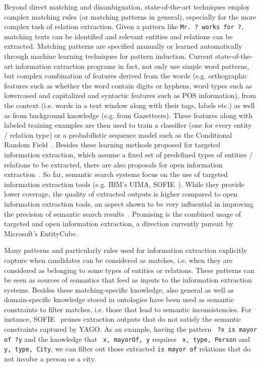 Beyond direct matching and disambiguation, state-of-the-art techniques employ complex matching rules (or matching patterns in general), especially for the more complex task of relation extraction. Given a pattern like \verb+Mr. ? works for ?+, matching texts can be identified and relevant entities and relations can be extracted. Matching patterns are specified manually or learned automatically through machine learning techniques for pattern induction. Current state-of-the-art information extraction programs in fact, not only use simple word patterns, but complex combination of features derived from the words (e.g. orthographic features such as whether the word contain digits or hyphens, word types such as lowercased and capitalized and syntactic features such as POS information), from the context (i.e. words in a text window along with their tags, labels etc.) as well as from background knowledge (e.g. from Gazetteers). These features along with labeled training examples are then used to train a classifier (one for every entity / relation type) or a probabilistic sequence model such as the Conditional Random Field~\cite{DBLP:conf/icml/ZhuNWZM05}. Besides these learning methods proposed for targeted information extraction, which assume a fixed set of predefined types of entities / relations to be extracted, there are also proposals for open information extraction~\cite{DBLP:conf/ijcai/EtzioniFCSM11}. So far, semantic search systems focus on the use of targeted information extraction tools (e.g. IBM's UIMA, SOFIE~\cite{DBLP:conf/www/SuchanekSW09}). While they provide lower coverage, the quality of extracted outputs is higher compared to open information extraction tools, an aspect shown to be very influential in improving the precision of semantic search results~\cite{DBLP:conf/sigir/Chu-CarrollPCFD06,DBLP:conf/cikm/Chu-CarrollP07}. Promising is the combined usage of targeted and open information extraction, a direction currently pursuit by Microsoft's EntityCube.  

Many patterns and particularly rules used for information extraction explicitly capture when candidates can be considered as matches, i.e. when they are considered as belonging to some types of entities or relations. These patterns can be seen as sources of semantics that feed as inputs to the information extraction systems. Besides these matching-specific knowledge, also general as well as domain-specific knowledge stored in ontologies have been used as semantic constraints to filter matches, i.e. those that lead to semantic inconsistencies. For instance, SOFIE~\cite{DBLP:conf/www/SuchanekSW09} prunes extraction outputs that do not satisfy the semantic constraints captured by YAGO. As an example, having the pattern \verb+ ?x is mayor of ?y+ and the knowledge that \verb+ x, mayorOf, y+ requires \verb+ x, type, Person+ and \verb+ y, type, City+, we can filter out those extracted \verb+is mayor of+ relations that do not involve a person or a city. 



